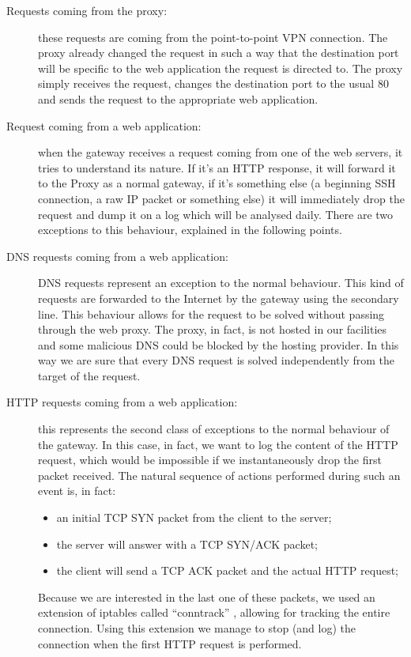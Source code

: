 \begin{description}
\item[Requests coming from the proxy: ] these requests are coming from the point-to-point VPN connection. The proxy already changed the request in such a way that the destination port will be specific to the web application the request is directed to. The proxy simply receives the request, changes the destination port to the usual 80 and sends the request to the appropriate web application.

\item[Request coming from a web application: ] when the gateway receives a request coming from one of the web servers, it tries to understand its nature. If it's an HTTP response, it will forward it to the Proxy as a normal gateway, if it's something else (a beginning SSH connection, a raw IP packet or something else) it will immediately drop the request and dump it on a log which will be analysed daily. There are two exceptions to this behaviour, explained in the following points.

\item[DNS requests coming from a web application: ] DNS requests represent an exception to the normal behaviour. This kind of requests are forwarded to the Internet by the gateway using the secondary line. This behaviour allows for the request to be solved without passing through the web proxy. The proxy, in fact, is not hosted in our facilities and some malicious DNS could be blocked by the hosting provider. In this way we are sure that every DNS request is solved independently from the target of the request.

\item[HTTP requests coming from a web application: ] this represents the second class of exceptions to the normal behaviour of the gateway. In this case, in fact, we want to log the content of the HTTP request, which would be impossible if we instantaneously drop the first packet received. The natural sequence of actions performed during such an event is, in fact:
\begin{itemize}
\item an initial TCP SYN packet from the client to the server;
\item the server will answer with a TCP SYN/ACK packet;
\item the client will send a TCP ACK packet and the actual HTTP request;
\end{itemize}
Because we are interested in the last one of these packets, we used an extension of iptables called ``conntrack'' \cite{conntrack}, allowing for tracking the entire connection. Using this extension we manage to stop (and log) the connection when the first HTTP request is performed.
\end{description}

